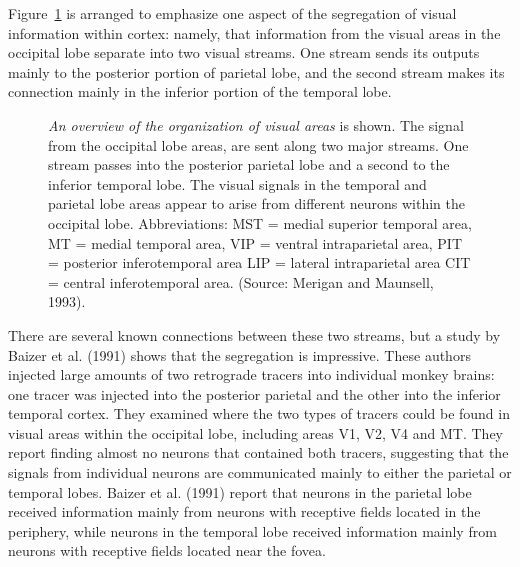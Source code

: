 Figure~\ref{f5:extraStriate} is arranged to emphasize
one aspect of the segregation of visual information within
cortex: namely,
that information from the visual areas in the occipital lobe
separate into two visual streams.
One stream sends its outputs mainly to the posterior
portion of parietal lobe,
and the second stream makes its connection
mainly in the inferior portion of the temporal lobe.
\begin{figure}
\centerline{
}
\caption[Visual Cortex Central to V1]{
{\em An overview of the organization of visual areas}
is shown.
The signal from the occipital lobe areas,
are sent along two major streams.
One stream passes into
the posterior parietal lobe and a second to the inferior temporal
lobe.
The visual signals in the temporal and parietal lobe areas
appear to arise from different neurons
within the occipital lobe.
Abbreviations: MST = medial superior temporal area, 
MT  = medial temporal area, 
VIP = ventral intraparietal area, 
PIT = posterior inferotemporal area
LIP = lateral intraparietal area
CIT = central inferotemporal area.
(Source:  Merigan and Maunsell, 1993).
}
\label{f5:extraStriate}
\end{figure}

There are several known
connections between these two streams,
but a study by Baizer et al. (1991) shows
that the segregation is impressive.
These authors injected large amounts of
two retrograde tracers into individual monkey brains:
one tracer was injected
into the posterior parietal and the other into
the inferior temporal cortex.
They examined where the two types of tracers could be found
in visual areas within the occipital lobe, including areas
V1, V2, V4 and MT.
They report finding almost no neurons that contained both tracers,
suggesting that the signals from individual neurons are communicated
mainly to either the parietal or temporal lobes.
Baizer et al. (1991) report that
neurons in the parietal lobe received information
mainly from neurons with receptive fields located in the
periphery, while neurons in the temporal lobe received information 
mainly from neurons with receptive fields located near the fovea.

